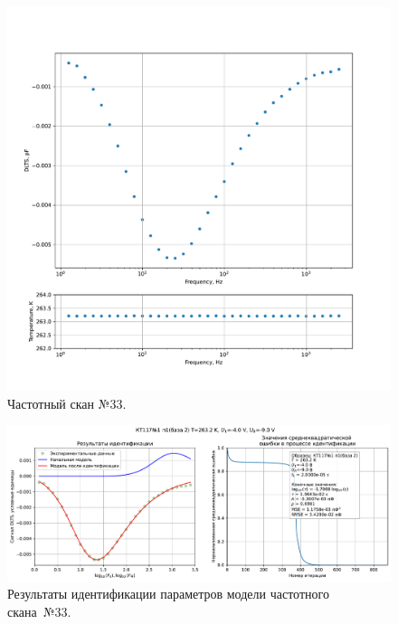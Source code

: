 \begin{figure}[!ht]
    \centering
    \includegraphics[width=1\textwidth]{../plots/КТ117№1_п1(база 2)_2500Гц-1Гц_1пФ_-10С_-4В-9В_100мВ_20мкс_шаг_0,1.pdf}
    \caption{Частотный скан №33.}
    \label{pic:frequency_scan_33}
\end{figure}

\begin{figure}[!ht]
    \centering
    \includegraphics[width=1\textwidth]{../plots/КТ117№1_п1(база 2)_2500Гц-1Гц_1пФ_-10С_-4В-9В_100мВ_20мкс_шаг_0,1_model.pdf}
    \caption{Результаты идентификации параметров модели частотного скана~№33.}
    \label{pic:frequency_scan_model33}
\end{figure}

\pagebreak


